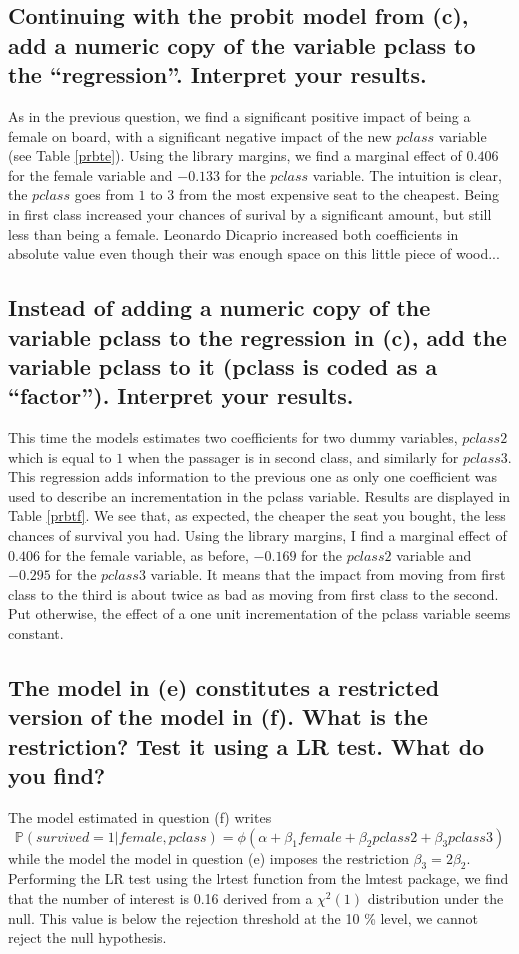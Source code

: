 \documentclass[12pt]{article}
\begin{document}
\subsection{Continuing with the probit model from (c), add a numeric copy of the variable pclass to the “regression”. Interpret your results.}
As in the previous question, we find a significant positive impact of being a female on board, with a significant negative impact of the new $pclass$ variable (see Table \ref{prbte}). Using the library margins, we find a marginal effect of $0.406$ for the female variable and $-0.133$ for the $pclass$ variable. The intuition is clear, the $pclass$ goes from $1$ to $3$ from the most expensive seat to the cheapest. Being in first class increased your chances of surival by a significant amount, but still less than being a female. Leonardo Dicaprio increased both coefficients in absolute value even though their was enough space on this little piece of wood...


\subsection{Instead of adding a numeric copy of the variable pclass to the regression in (c), add the variable pclass to it (pclass is coded as a “factor”). Interpret your results.}
This time the models estimates two coefficients for two dummy variables, $pclass2$ which is equal to $1$ when the passager is in second class, and similarly for $pclass3$. This regression adds information to the previous one as only one coefficient was used to describe an incrementation in the pclass variable. Results are displayed in Table \ref{prbtf}. We see that, as expected, the cheaper the seat you bought, the less chances of survival you had. Using the library margins, I find a marginal effect of $0.406$ for the female variable, as before, $-0.169$ for the $pclass2$ variable and $-0.295$ for the $pclass3$ variable. It means that the impact from moving from first class to the third is about twice as bad as moving from first class to the second. Put otherwise, the effect of a one unit incrementation of the pclass variable seems constant.


\subsection{The model in (e) constitutes a restricted version of the model in (f). What is the restriction? Test it using a LR test. What do you find?}
The model estimated in question (f) writes
$$\mathbb{P}(survived = 1 | female, pclass) = \phi(\alpha + \beta_1 female + \beta_2 pclass2 + \beta_3 pclass 3)$$
while the model the model in question (e) imposes the restriction $\beta_3 = 2 \beta_2$.
Performing the LR test using the lrtest function from the lmtest package, we find that the number of interest is 0.16 derived from a $\chi^2(1)$ distribution under the null. This value is below the rejection threshold at the 10 \% level, we cannot reject the null hypothesis.
\end{document}
